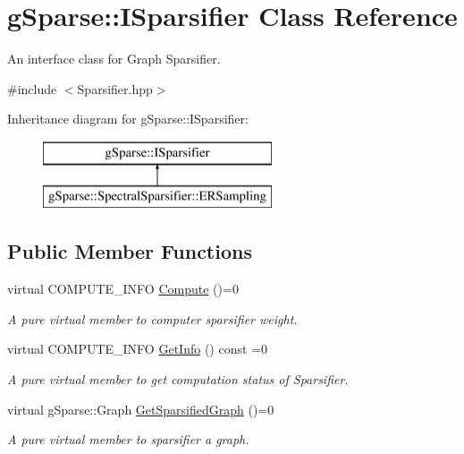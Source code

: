 \hypertarget{classg_sparse_1_1_i_sparsifier}{}\section{g\+Sparse\+:\+:I\+Sparsifier Class Reference}
\label{classg_sparse_1_1_i_sparsifier}


An interface class for Graph Sparsifier.  




{\ttfamily \#include $<$Sparsifier.\+hpp$>$}

Inheritance diagram for g\+Sparse\+:\+:I\+Sparsifier\+:\begin{figure}[H]
\begin{center}
\leavevmode
\includegraphics[height=2.000000cm]{classg_sparse_1_1_i_sparsifier}
\end{center}
\end{figure}
\subsection*{Public Member Functions}
\begin{DoxyCompactItemize}
\item 
\mbox{\label{classg_sparse_1_1_i_sparsifier_a06f2be6951ef90ec695cadf57ce2cb3e}} 
virtual C\+O\+M\+P\+U\+T\+E\+\_\+\+I\+N\+FO \mbox{\hyperlink{classg_sparse_1_1_i_sparsifier_a06f2be6951ef90ec695cadf57ce2cb3e}{Compute}} ()=0
\begin{DoxyCompactList}\small\item\em A pure virtual member to computer sparsifier weight. \end{DoxyCompactList}\item 
\mbox{\label{classg_sparse_1_1_i_sparsifier_ad69f4c1fed9c6bc8778b716885f8fe04}} 
virtual C\+O\+M\+P\+U\+T\+E\+\_\+\+I\+N\+FO \mbox{\hyperlink{classg_sparse_1_1_i_sparsifier_ad69f4c1fed9c6bc8778b716885f8fe04}{Get\+Info}} () const =0
\begin{DoxyCompactList}\small\item\em A pure virtual member to get computation status of Sparsifier. \end{DoxyCompactList}\item 
\mbox{\label{classg_sparse_1_1_i_sparsifier_a2e1abc3830d561366a0c0e1477510c63}} 
virtual g\+Sparse\+::\+Graph \mbox{\hyperlink{classg_sparse_1_1_i_sparsifier_a2e1abc3830d561366a0c0e1477510c63}{Get\+Sparsified\+Graph}} ()=0
\begin{DoxyCompactList}\small\item\em A pure virtual member to sparsifier a graph. \end{DoxyCompactList}\end{DoxyCompactItemize}


